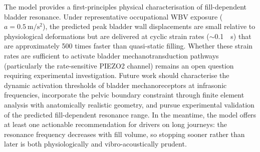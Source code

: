 The model provides a first-principles physical characterisation of
fill-dependent bladder resonance.  Under representative occupational WBV
exposure ($a = \SI{0.5}{\metre\per\second\squared}$), the predicted peak
bladder wall displacements are small relative to physiological deformations
but are delivered at cyclic strain rates ($\sim$\SI{0.1}{\per\second}) that
are approximately 500 times faster than quasi-static filling.  Whether these
strain rates are sufficient to activate bladder mechanotransduction pathways
(particularly the rate-sensitive PIEZO2 channel) remains an open question
requiring experimental investigation.  Future work should characterise the
dynamic activation thresholds of bladder mechanoreceptors at infrasonic
frequencies, incorporate the pelvic boundary constraint through finite
element analysis with anatomically realistic geometry, and pursue
experimental validation of the predicted fill-dependent resonance range.
In the meantime, the model offers at least one actionable recommendation
for drivers on long journeys: the resonance frequency decreases with fill
volume, so stopping sooner rather than later is both physiologically and
vibro-acoustically prudent.
